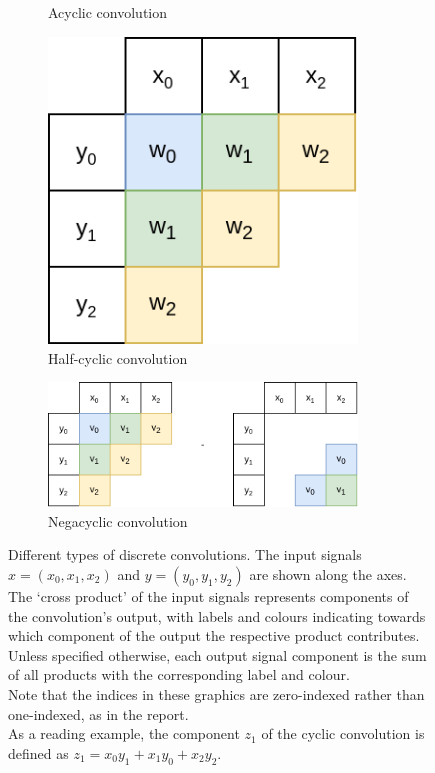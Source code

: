 \begin{figure}
\begin{subfigure}{.33\textwidth}
				\caption{Acyclic convolution}
				\label{fig:acyclic_convolution}
		\end{subfigure}%
		\begin{subfigure}{.33\textwidth}
				\centering
				\includegraphics[width=0.9\textwidth]{../resources/halfcyclic_convolution.drawio.png}
				\caption{Half-cyclic convolution}
				\label{fig:halfcyclic_convolution}
		\end{subfigure}
		\begin{subfigure}{.66\textwidth}
				\centering
				\includegraphics[width=0.9\textwidth]{../resources/negacyclic_convolution.drawio.png}
				\caption{Negacyclic convolution}
				\label{fig:negacyclic_convolution}
		\end{subfigure}
		\caption{
				Different types of discrete convolutions. The input signals $x
				= (x_0, x_1, x_2)$ and $y = (y_0, y_1, y_2)$ are shown along
				the axes. The `cross product' of the input signals represents
				components of the convolution's output, with  labels and
				colours indicating towards which component of the output the
				respective product contributes.  Unless specified otherwise,
				each output signal component is the sum of all products with
				the corresponding label and colour.\\
				Note that the indices in these graphics are zero-indexed rather
				than one-indexed, as in the report.\\
				As a reading example, the component $z_1$ of the cyclic
				convolution is defined as $z_1 = x_0 y_1 + x_1 y_0 + x_2 y_2$.
}
\end{figure}

